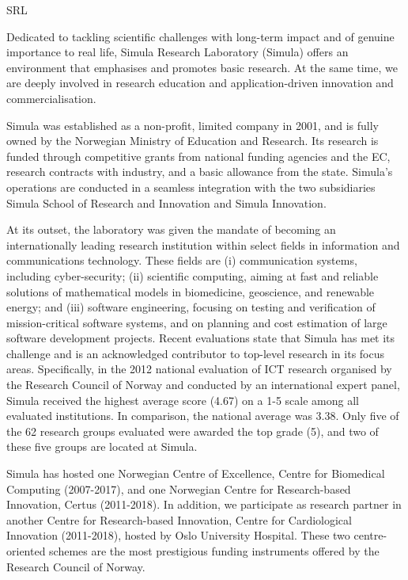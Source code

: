 \begin{sitedescription}{SRL}

Dedicated to tackling scientific challenges with long-term impact and of genuine importance to real life, Simula Research Laboratory (Simula) offers an environment that emphasises and promotes basic research. At the same time, we are deeply involved in research education and application-driven innovation and commercialisation.

Simula was established as a non-profit, limited company in 2001, and is fully owned by the Norwegian Ministry of Education and Research. Its research is funded through competitive grants from national funding agencies and the EC, research contracts with industry, and a basic allowance from the state.  Simula's operations are conducted in a seamless integration with the two subsidiaries Simula School of Research and Innovation and Simula Innovation.

At its outset, the laboratory was given the mandate of becoming an internationally leading research institution within select fields in information and communications technology. These fields are (i) communication systems, including cyber-security; (ii) scientific computing, aiming at fast and reliable solutions of mathematical models in biomedicine, geoscience, and renewable energy; and (iii) software engineering, focusing on testing and verification of mission-critical software systems, and on planning and cost estimation of large software development projects. Recent evaluations state that Simula has met its challenge and is an acknowledged contributor to top-level research in its focus areas. Specifically, in the 2012 national evaluation of ICT research organised by the Research Council of Norway and conducted by an international expert panel, Simula received the highest average score (4.67) on a 1-5 scale among all evaluated institutions.  In comparison, the national average was 3.38. Only five of the 62 research groups evaluated were awarded the top grade (5), and two of these five groups are located at Simula.

Simula has hosted one Norwegian Centre of Excellence, Centre for Biomedical Computing (2007-2017), and one Norwegian Centre for Research-based Innovation, Certus (2011-2018). In addition, we participate as research partner in another Centre for Research-based Innovation, Centre for Cardiological Innovation (2011-2018), hosted by Oslo University Hospital. These two centre-oriented schemes are the most prestigious funding instruments offered by the Research Council of Norway.


\end{sitedescription}
